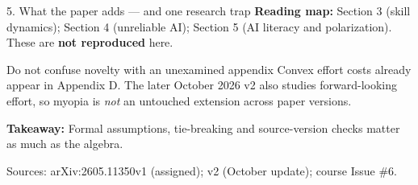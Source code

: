 \documentclass[aspectratio=169,11pt]{beamer}
\newcommand{\highlight}[1]{{\color{accent}\bfseries #1}}
\begin{document}
\begin{frame}{5. What the paper adds --- and one research trap}
  \large
  \textbf{Reading map:} Section 3 (skill dynamics); Section 4 (unreliable AI); Section 5 (AI literacy and polarization). These are \highlight{not reproduced} here.
  \vspace{0.42cm}
  \begin{block}{Do not confuse novelty with an unexamined appendix}
    \normalsize
    Convex effort costs already appear in Appendix D. The later October 2026 v2 also studies forward-looking effort, so myopia is \emph{not} an untouched extension across paper versions.
  \end{block}
  \vspace{0.28cm}
  \par\highlight{Takeaway:} Formal assumptions, tie-breaking and source-version checks matter as much as the algebra.
  \vspace{0.10cm}
  \par{\scriptsize Sources: arXiv:2605.11350v1 (assigned); v2 (October update); course Issue \#6.}
\end{frame}
\end{document}
